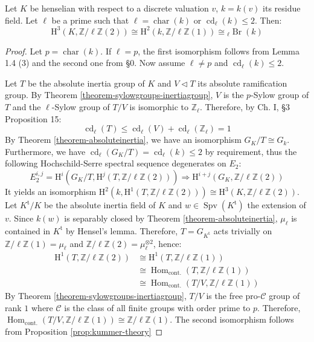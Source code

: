 \begin{lemma}\label{2.4-pre}
Let $K$ be henselian with respect to a discrete valuation $v$, $k=k(v)$ its residue field. Let $\ell$ be a prime such that $\ell=\operatorname{char}(k)$ or $\operatorname{cd}_\ell(k)\leq 2$. Then:
\[ \mathrm{H}^3(K, \mathbb{Z}/\ell\mathbb{Z}(2)) \cong \mathrm{H}^2(k, \mathbb{Z}/\ell\mathbb{Z}(1)) \cong {}_\ell\operatorname{Br}(k) \]
\end{lemma}

\begin{proof}
Let $p=\operatorname{char}(k)$. If $\ell = p$, the first isomorphism follows from \cite{Ka86} Lemma 1.4 (3) and the second one from \cite{Ka86} §0. Now assume $\ell\neq p$ and $\operatorname{cd}_\ell(k)\leq 2$.

Let $T$ be the absolute inertia group of $K$ and $V\lhd T$ its absolute ramification group. By Theorem \ref{theorem-sylowgroups-inertiagroup}, $V$ is the $p$-Sylow group of $T$ and the $\ell$-Sylow group of $T/V$ is isomorphic to $\mathbb{Z}_\ell$. Therefore, by \cite{Se64} Ch. I, §3 Proposition 15:
\[ \operatorname{cd}_\ell(T)\leq \operatorname{cd}_\ell(V) + \operatorname{cd}_\ell(\mathbb{Z}_\ell) = 1 \]
By Theorem \ref{theorem-absoluteinertia}, we have an isomorphism $G_K/T\cong G_k$. Furthermore, we have $\operatorname{cd}_\ell(G_K/T)=\operatorname{cd}_\ell(k)\leq 2$ by requirement,
thus the following Hochschild-Serre spectral sequence degenerates on $E_2$:
\[E_2^{i,j}=\mathrm{H}^i(G_K/T, \mathrm{H}^j(T, \mathbb{Z}/\ell\mathbb{Z}(2)))\Longrightarrow\mathrm{H}^{i+j}(G_K, \mathbb{Z}/\ell\mathbb{Z}(2))\]
It yields an isomorphism $\mathrm{H}^2(k, \mathrm{H}^1(T, \mathbb{Z}/\ell\mathbb{Z}(2)))\cong \mathrm{H}^3(K, \mathbb{Z}/\ell\mathbb{Z}(2))$. Let $K^\text{t}/K$ be the absolute inertia field of $K$ and $w\in\operatorname{Spv}(K^\text{t})$ the extension of $v$. Since $k(w)$ is separably closed by Theorem \ref{theorem-absoluteinertia}, $\mu_{\ell}$ is contained in $K^\text{t}$ by Hensel's lemma. Therefore, $T = G_{K^\text{t}}$ acts trivially on $\mathbb{Z}/\ell\mathbb{Z}(1)= \mu_{\ell}$ and $\mathbb{Z}/\ell\mathbb{Z}(2)=\mu_{\ell}^{\otimes 2}$, hence:
\begin{align*}
\mathrm{H}^1(T, \mathbb{Z}/\ell\mathbb{Z}(2)) &\cong \mathrm{H}^1(T, \mathbb{Z}/\ell\mathbb{Z}(1)) \\
&\cong \operatorname{Hom}_\text{cont.}(T, \mathbb{Z}/\ell\mathbb{Z}(1)) \\
&\cong \operatorname{Hom}_\text{cont.}(T/V, \mathbb{Z}/\ell\mathbb{Z}(1))
\end{align*}
By Theorem \ref{theorem-sylowgroups-inertiagroup}, $T/V$ is the free pro-$\mathcal{C}$ group of rank $1$ where $\mathcal{C}$ is the class of all finite groups with order prime to $p$. Therefore, $\operatorname{Hom}_\text{cont.}(T/V, \mathbb{Z}/\ell\mathbb{Z}(1))\cong \mathbb{Z}/\ell\mathbb{Z}(1)$. The second isomorphism follows from Proposition \ref{prop:kummer-theory}
\end{proof}

